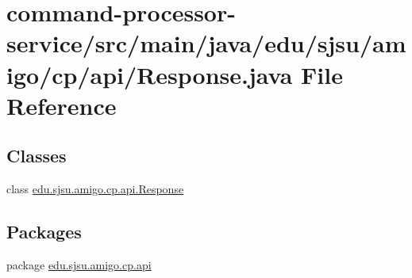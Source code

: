 \hypertarget{command-processor-service_2src_2main_2java_2edu_2sjsu_2amigo_2cp_2api_2_response_8java}{}\section{command-\/processor-\/service/src/main/java/edu/sjsu/amigo/cp/api/\+Response.java File Reference}
\label{command-processor-service_2src_2main_2java_2edu_2sjsu_2amigo_2cp_2api_2_response_8java}
\subsection*{Classes}
\begin{DoxyCompactItemize}
\item 
class \hyperlink{classedu_1_1sjsu_1_1amigo_1_1cp_1_1api_1_1_response}{edu.\+sjsu.\+amigo.\+cp.\+api.\+Response}
\end{DoxyCompactItemize}
\subsection*{Packages}
\begin{DoxyCompactItemize}
\item 
package \hyperlink{namespaceedu_1_1sjsu_1_1amigo_1_1cp_1_1api}{edu.\+sjsu.\+amigo.\+cp.\+api}
\end{DoxyCompactItemize}
